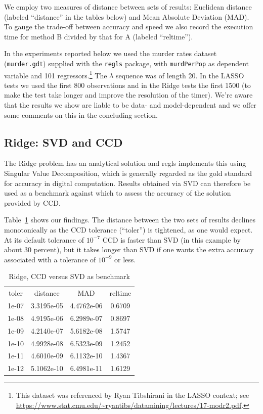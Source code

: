 \documentclass{article}
\begin{document}
We employ two measures of distance between sets of results: Euclidean
distance (labeled ``distance'' in the tables below) and Mean Absolute
Deviation (MAD). To gauge the trade-off between accuracy and speed we
also record the execution time for method B divided by that for A
(labeled ``reltime'').

In the experiments reported below we used the murder rates dataset
(\texttt{murder.gdt}) supplied with the \texttt{regls} package, with
\texttt{murdPerPop} as dependent variable and 101
regressors.\footnote{This dataset was referenced by Ryan Tibshirani in
  the LASSO context; see
  \url{https://www.stat.cmu.edu/~ryantibs/datamining/lectures/17-modr2.pdf}.}
The $\lambda$ sequence was of length 20. In the LASSO tests we used
the first 800 observations and in the Ridge tests the first 1500 (to
make the test take longer and improve the resolution of the
timer). We're aware that the results we show are liable to be data-
and model-dependent and we offer some comments on this in the
concluding section.

\subsection*{Ridge: SVD and CCD}

The Ridge problem has an analytical solution and \textsf{regls}
implements this using Singular Value Decomposition, which is generally
regarded as the gold standard for accuracy in digital
computation. Results obtained via SVD can therefore be used as a
benchmark against which to assess the accuracy of the solution
provided by CCD.

Table~\ref{tab:svd-ccd} shows our findings. The distance between the
two sets of results declines monotonically as the CCD tolerance
(``toler'') is tightened, as one would expect. At its default
tolerance of $10^{-7}$ CCD is faster than SVD (in this example by
about 30 percent), but it takes longer than SVD if one wants the extra
accuracy associated with a tolerance of $10^{-9}$ or less.


\begin{table}[htbp]
\begin{center}
\begin{tabular}{cccc}
toler & distance & MAD & reltime \\[4pt]
1e-07 & 3.3195e-05 & 4.4762e-06 & 0.6709 \\
1e-08 & 4.9195e-06 & 6.2989e-07 & 0.8697 \\
1e-09 & 4.2140e-07 & 5.6182e-08 & 1.5747 \\
1e-10 & 4.9928e-08 & 6.5323e-09 & 1.2452 \\
1e-11 & 4.6010e-09 & 6.1132e-10 & 1.4367 \\
1e-12 & 5.1062e-10 & 6.4981e-11 & 1.6129 \\
\end{tabular}
\caption{Ridge, CCD versus SVD as benchmark}
\label{tab:svd-ccd}
\end{center}
\end{table}
\end{document}
